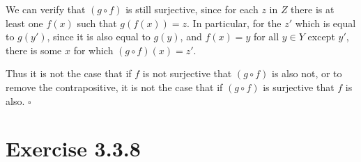 \documentclass{assignment}
\begin{document}
\begin{enumerate}
\begin{center}
    \end{center}

    We can verify that $(g \circ f)$ is still surjective, since for each $z$ in $Z$ there is at least one $f(x)$ such that $g(f(x))=z$. 
    In particular, for the $z'$ which is equal to $g(y')$, since it is also equal to $g(y)$, and $f(x)=y$ for all $y \in Y$ except $y'$, there is some $x$ for which $(g \circ f)(x)=z'$.

    Thus it is not the case that if $f$ is not surjective that $(g \circ f)$ is also not, or to remove the contrapositive, it is not the case that if $(g \circ f)$ is surjective that $f$ is also.
    $\square$
\end{enumerate}

\section*{Exercise 3.3.8}
\end{document}
